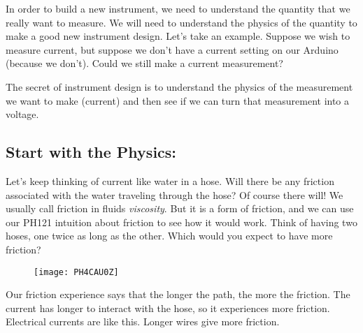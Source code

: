In order to build a new instrument, we need to understand the quantity that
we really want to measure. We will need to understand the physics of the
quantity to make a good new instrument design. Let's take an example.
Suppose we wish to measure current, but suppose we don't have a current
setting on our Arduino (because we don't). Could we still make a current
measurement?

The secret of instrument design is to understand the physics of the
measurement we want to make (current) and then see if we can turn that
measurement into a voltage.

\subsection{Start with the Physics:}

Let's keep thinking of current like water in a hose. Will there be any
friction associated with the water traveling through the hose? Of course
there will! We usually call friction in fluids \emph{viscosity}. But it is a
form of friction, and we can use our PH121 intuition about friction to see
how it would work. Think of having two hoses, one twice as long as the
other. Which would you expect to have more friction? \begin{figure}[h!]
\texttt{[image: PH4CAU0Z]}
\end{figure}

Our friction experience says that the longer the path, the more the
friction. The current has longer to interact with the hose, so it
experiences more friction. Electrical currents are like this. Longer wires
give more friction.

